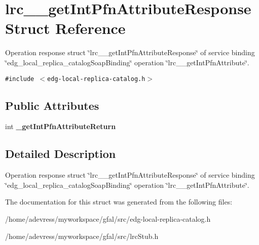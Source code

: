 \section{lrc\_\-\_\-get\-Int\-Pfn\-Attribute\-Response Struct Reference}
\label{structlrc____getIntPfnAttributeResponse}
Operation response struct \char`\"{}lrc\_\-\_\-get\-Int\-Pfn\-Attribute\-Response\char`\"{} of service binding \char`\"{}edg\_\-local\_\-replica\_\-catalog\-Soap\-Binding\char`\"{} operation \char`\"{}lrc\_\-\_\-get\-Int\-Pfn\-Attribute\char`\"{}.  


{\tt \#include $<$edg-local-replica-catalog.h$>$}

\subsection*{Public Attributes}
\begin{CompactItemize}
\item 
int \textbf{\_\-get\-Int\-Pfn\-Attribute\-Return}\label{structlrc____getIntPfnAttributeResponse_42939d6d4d13e2112c7f5b4074e07462}

\end{CompactItemize}


\subsection{Detailed Description}
Operation response struct \char`\"{}lrc\_\-\_\-get\-Int\-Pfn\-Attribute\-Response\char`\"{} of service binding \char`\"{}edg\_\-local\_\-replica\_\-catalog\-Soap\-Binding\char`\"{} operation \char`\"{}lrc\_\-\_\-get\-Int\-Pfn\-Attribute\char`\"{}. 



The documentation for this struct was generated from the following files:\begin{CompactItemize}
\item 
/home/adevress/myworkspace/gfal/src/edg-local-replica-catalog.h\item 
/home/adevress/myworkspace/gfal/src/lrc\-Stub.h\end{CompactItemize}
